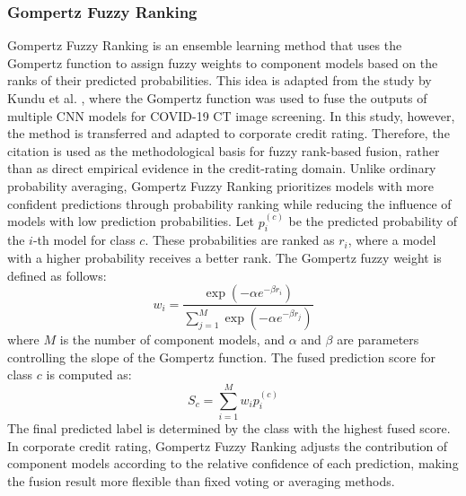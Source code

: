 \documentclass[10pt,twoside]{article}
\begin{document}
\subsubsection{Gompertz Fuzzy Ranking}
Gompertz Fuzzy Ranking is an ensemble learning method that uses the Gompertz function to assign fuzzy weights to component models based on the ranks of their predicted probabilities. This idea is adapted from the study by Kundu et al. \cite{kundu_fuzzy_2021}, where the Gompertz function was used to fuse the outputs of multiple CNN models for COVID-19 CT image screening. In this study, however, the method is transferred and adapted to corporate credit rating. Therefore, the citation \cite{kundu_fuzzy_2021} is used as the methodological basis for fuzzy rank-based fusion, rather than as direct empirical evidence in the credit-rating domain. Unlike ordinary probability averaging, Gompertz Fuzzy Ranking prioritizes models with more confident predictions through probability ranking while reducing the influence of models with low prediction probabilities. Let $p_i^{(c)}$ be the predicted probability of the $i$-th model for class $c$. These probabilities are ranked as $r_i$, where a model with a higher probability receives a better rank. The Gompertz fuzzy weight is defined as follows:
\begin{equation}
w_i = \frac{\exp \left(-\alpha e^{-\beta r_i}\right)} {\sum_{j=1}^{M} \exp \left(-\alpha e^{-\beta r_j}\right)}
\end{equation}
where $M$ is the number of component models, and $\alpha$ and $\beta$ are parameters controlling the slope of the Gompertz function. The fused prediction score for class $c$ is computed as:
\begin{equation}
S_c = \sum_{i=1}^{M} w_i p_i^{(c)}
\end{equation}
The final predicted label is determined by the class with the highest fused score. In corporate credit rating, Gompertz Fuzzy Ranking adjusts the contribution of component models according to the relative confidence of each prediction, making the fusion result more flexible than fixed voting or averaging methods.
\end{document}
